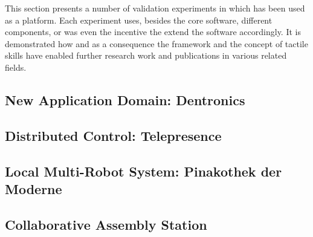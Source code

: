 This section presents a number of validation experiments in which \softwareabbr{} has been used as a platform.
Each experiment uses, besides the core software, different components, or was even the incentive the extend the software accordingly.
It is demonstrated how \softwareabbr{} and as a consequence the \skillmodelabbr{} framework and the concept of tactile skills have enabled further research work and publications in various related fields.

\subsection{New Application Domain: Dentronics}
\label{ch:architecture:system:dentronics}
\subsection{Distributed Control: Telepresence}\label{ch:architecture:system:telepresence}

\subsection{Local Multi-Robot System: Pinakothek der Moderne}\label{ch:architecture:system:pinakothek}

\subsection{Collaborative Assembly Station}\label{ch:architecture:system:assembly}

